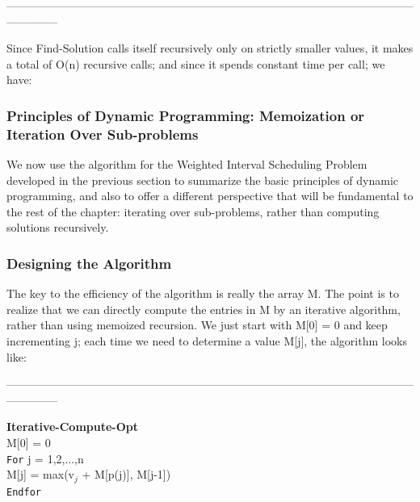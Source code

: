 \documentclass{article}
\begin{document}
\medskip

--------------------------------------------------------------------------------------------------------------------------
\medskip

Since Find-Solution calls itself recursively only on strictly smaller values, it makes a total of O(n) recursive calls; and since it spends constant time per call; we have:\\


\subsubsection{Principles of Dynamic Programming: Memoization or Iteration Over Sub-problems}
We now use the algorithm for the Weighted Interval Scheduling Problem developed in the previous section to summarize the basic principles of dynamic programming, and also to offer a different perspective that will be fundamental to the rest of the chapter: iterating over sub-problems, rather than computing solutions recursively.\\

\subsubsection{Designing the Algorithm}
The key to the efficiency of the algorithm is really the array M. The point is to realize that we can directly compute the entries in M by an iterative algorithm, rather than using memoized recursion. We just start with M[0] = 0 and keep incrementing j; each time we need to determine a value M[j], the algorithm looks like:\\

\medskip

--------------------------------------------------------------------------------------------------------------------------
\medskip

\textbf{Iterative-Compute-Opt}\\
M[0] = 0\\
\texttt{For} j = 1,2,...,n\\
M[j] = max(v$_j$ + M[p(j)], M[j-1])\\
\texttt{Endfor}\\
\end{document}
